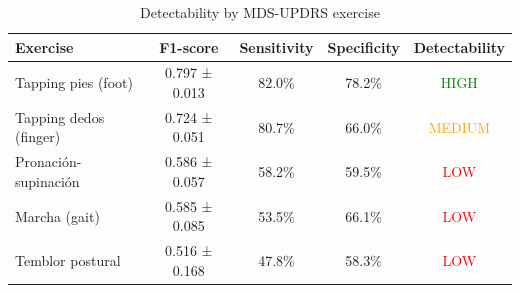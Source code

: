 \begin{table}[H]
\centering
\caption{Detectability by MDS-UPDRS exercise}
\label{tab:symptoms}
\begin{tabular}{lcccc}
\toprule
\textbf{Exercise} & \textbf{F1-score} & \textbf{Sensitivity} & \textbf{Specificity} & \textbf{Detectability} \\
\midrule
Tapping pies (foot) & 0.797 ± 0.013 & 82.0\% & 78.2\% & \textcolor{green}{HIGH} \\
Tapping dedos (finger) & 0.724 ± 0.051 & 80.7\% & 66.0\% & \textcolor{orange}{MEDIUM} \\
Pronación-supinación & 0.586 ± 0.057 & 58.2\% & 59.5\% & \textcolor{red}{LOW} \\
Marcha (gait) & 0.585 ± 0.085 & 53.5\% & 66.1\% & \textcolor{red}{LOW} \\
Temblor postural & 0.516 ± 0.168 & 47.8\% & 58.3\% & \textcolor{red}{LOW} \\
\bottomrule
\end{tabular}
\end{table}
